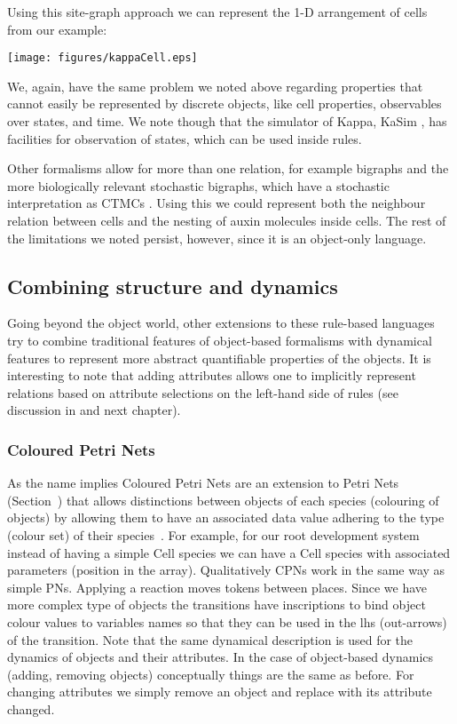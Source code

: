 Using this site-graph approach we can represent the 1-D arrangement of cells from
our example:
\begin{center}
    \texttt{[image: figures/kappaCell.eps]}
\end{center}
We, again, have the same problem we noted above regarding properties that cannot
easily be represented by discrete objects, like cell properties, observables
over states, and time. We note though that the simulator of Kappa, KaSim
\citep{kasimmanual2018}, has facilities for observation of states, which can be
used inside rules.

Other formalisms allow for more than one relation, for example bigraphs
\citep{milner1999communicating} and the more biologically relevant stochastic
bigraphs, which have a stochastic interpretation as CTMCs
\citep{krivine_stochastic_2008}. Using this we could represent both the
neighbour relation between cells and the nesting of auxin molecules inside
cells. The rest of the limitations we noted persist, however, since it is an
object-only language.

\subsection{Combining structure and dynamics}
\label{subsec:structDynLangs}
Going beyond the object world, other extensions to these rule-based languages
try to combine traditional features of object-based formalisms with dynamical
features to represent more abstract quantifiable properties of the objects.  It
is interesting to note that adding attributes allows one to implicitly represent
relations based on attribute selections on the left-hand side of rules (see
discussion in  and next chapter).

\subsubsection*{Coloured Petri Nets}
\label{subsec:cpns}
As the name implies Coloured Petri Nets are an extension to Petri Nets
(Section~) that allows distinctions between objects of each species
(colouring of objects) by allowing them to have an associated data value
adhering to the type (colour set) of their
species~\citep{jensen_coloured_1987}. For example, for our root development
system instead of having a simple $\mathrm{Cell}$ species we can have a
$\mathrm{Cell}$ species with associated parameters (\eg position in the
array). Qualitatively CPNs work in the same way as simple PNs. Applying a
reaction moves tokens between places. Since we have more complex type of objects
the transitions have inscriptions to bind object colour values to variables
names so that they can be used in the lhs (out-arrows) of the transition. Note
that the same dynamical description is used for the dynamics of objects and
their attributes. In the case of object-based dynamics (adding, removing
objects) conceptually things are the same as before. For changing attributes we
simply remove an object and replace with its attribute changed.

